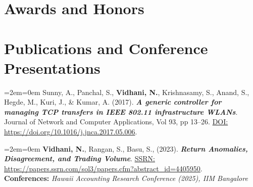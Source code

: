 \documentclass[11pt,a4paper,]{moderncv}
\begin{document}
\hypertarget{awards-and-honors}{
\section{Awards and Honors}\label{awards-and-honors}}

\nopagebreak




\pagebreak


\hypertarget{publications-and-conference-presentations}{
\section{Publications and Conference
Presentations}\label{publications-and-conference-presentations}}

\begingroup
\setlength{\parindent}{-0.5in}
\setlength{\leftskip}{0.5in}

  \par
  \medskip
  \leftskip=2em\rightskip=0em
  \noindent\ignorespaces
Sunny, A., Panchal, S., \textbf{Vidhani, N.}, Krishnasamy, S., Anand, S., Hegde, M., Kuri, J., \& Kumar, A. (2017).
\textbf{\textit{A generic controller for managing TCP transfers in IEEE 802.11 infrastructure WLANs}}. Journal of Network and Computer Applications, Vol 93, pp 13--26. \underline{DOI:} \url{https://doi.org/10.1016/j.jnca.2017.05.006}.\\
  \par\medskip

  \par
  \medskip
  \leftskip=2em\rightskip=0em
  \noindent\ignorespaces
\textbf{Vidhani, N.}, Rangan, S., Basu, S., (2023). \textbf{\textit{Return Anomalies, Disagreement, and Trading Volume}}. \underline{SSRN:} \url{https://papers.ssrn.com/sol3/papers.cfm?abstract_id=4405950}.\\
\textbf{Conferences:} \textit{Hawaii Accounting Research Conference (2025), IIM Bangalore}\\
  \par\medskip
\end{document}

